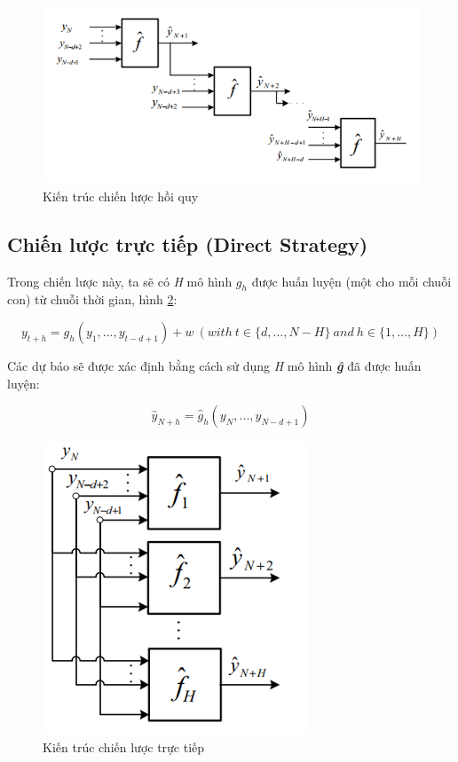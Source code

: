 \begin{figure}[H]
    \centering
    \includegraphics[scale=1.25]{./content/images/3-1.png}
    \caption{Kiến trúc chiến lược hồi quy \cite{st17}}
    \label{fig:3-1}
\end{figure}

\subsection{Chiến lược trực tiếp (Direct Strategy)}
Trong chiến lược này, ta sẽ có \textit{H} mô hình \textbf{\textit{$g_{h}$}} được huấn luyện (một cho mỗi chuỗi con) từ chuỗi thời gian, hình \ref{fig:3-2}:

\begin{equation}
\label{eq:14}
y_{t+h}=g_h (y_1,...,y_{t-d+1} )+ w \: (with \: t\in \{d,...,N-H\} \: and \: h\in\{1,...,H\})
\tag{14}
\end{equation}

Các dự báo sẽ được xác định bằng cách sử dụng \textit{H} mô hình \textbf{\textit{ĝ}} đã được huấn luyện:

\begin{equation}
\label{eq:15}
\widehat{y}_{N+h} = \widehat{g}_{h}(y_N,...,y_{N-d+1})
\tag{15}
\end{equation}

\begin{figure}[!h]
    \centering
    \includegraphics[scale=1.25]{./content/images/3-2.png}
    \caption{Kiến trúc chiến lược trực tiếp \cite{st17}}
    \label{fig:3-2}
\end{figure}

